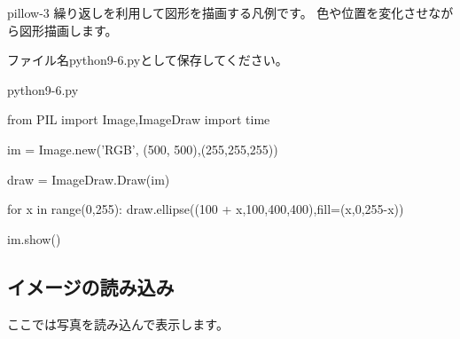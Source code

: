 \documentclass[11pt,a4paper,dvipdfmx,titlepage]{jsreport}
\begin{document}
\begin{pabox}{pillow-3}
繰り返しを利用して図形を描画する凡例です。
色や位置を変化させながら図形描画します。

ファイル名python9-6.pyとして保存してください。
\begin{codebox}{python9-6.py}
\begin{listing}{1}
from PIL import Image,ImageDraw
import time

im = Image.new('RGB', (500, 500),(255,255,255))

draw = ImageDraw.Draw(im)

for x in range(0,255):
    draw.ellipse((100 + x,100,400,400),fill=(x,0,255-x))  

im.show()
\end{listing}
\end{codebox}
\end{pabox}

\subsection{イメージの読み込み}
ここでは写真を読み込んで表示します。
\end{document}

